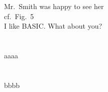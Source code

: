 \documentclass[a4paper, 11pt]{article}
\begin{document}




Mr.~Smith was happy to see her\\
cf.~Fig.~5\\
I like BASIC\@. What about you?
\\

\frenchspacing



\appendix
\section{}
aaaa
\section{}
bbbb
\end{document}
